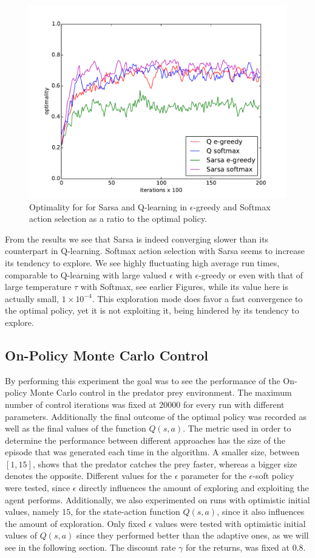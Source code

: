 \documentclass[paper=a4, fontsize=11pt]{scrartcl}
\numberwithin{equation}{section}		%
\numberwithin{figure}{section}			%
\numberwithin{table}{section}				%
\begin{document}
\begin{figure}[H] \centering
\includegraphics[scale=0.6]{sarsaOptimality.pdf}
\caption{Optimality for for Sarsa and Q-learning in $\epsilon$-greedy and Softmax action selection as a ratio to the optimal policy.} 
\label{figure:sarsaOpti}
\end{figure}
From the results we see that Sarsa is indeed converging slower than its counterpart in Q-learning. Softmax action selection with Sarsa seems to increase its tendency to explore. We see highly fluctuating high average run times, comparable to Q-learning with large valued $\epsilon$ with $\epsilon$-greedy or even with that of large temperature $\tau$ with Softmax, see earlier Figures, while its value here is actually small, $1 \times 10^{-4}$. This exploration mode does favor a fast  convergence to the optimal policy, yet it is not exploiting it, being hindered by its tendency to explore.

\subsection{On-Policy Monte Carlo Control}
By performing this experiment the goal was to see the performance of the On-policy Monte Carlo control in the predator prey environment. The maximum number of control iterations was fixed at $20000$ for every run with different parameters. Additionally the final outcome of the optimal policy was recorded as well as the final values of the function $Q(s,a)$. The metric used in order to determine the performance between different approaches has the size of the episode that was generated each time in the algorithm. A smaller size, between $[1,15]$, shows that the predator catches the prey faster, whereas a bigger size denotes the opposite. Different values for the $\epsilon$ parameter for the $\epsilon$-soft policy were tested, since $\epsilon$ directly influences the amount of exploring and exploiting the agent performs. Additionally, we also experimented on runs with optimistic initial values, namely $15$, for the state-action function $Q(s,a)$, since it also influences the amount of exploration. Only fixed $\epsilon$ values were tested with optimistic initial values of $Q(s,a)$ since they performed better than the adaptive ones, as we will see in the following section. The discount rate $\gamma$ for the returns, was fixed at 0.8.
\end{document}
